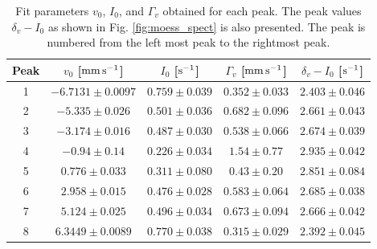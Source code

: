 \documentclass[a4paper]{report}
\numberwithin{equation}{section}
\begin{document}
\begin{table}[!ht]
    \centering
    \begin{tabular}{|c|c|c|c|c|}
    \hline
    Peak & $v_0$ [$\si[]{\milli\meter\per\second}$] & $I_0$ [$\si[]{\per\second}$] & $\Gamma_v$ [$\si[]{\milli\meter\per\second}$] & $\delta_v - I_0$ [$\si[]{\per\second}$]\\ \hline
        1 &$-6.7131 \pm 0.0097 $& $0.759 \pm 0.039$ & $0.352 \pm 0.033$ & $2.403 \pm 0.046$ \\ \hline
        2 &$-5.335 \pm 0.026 $& $0.501 \pm 0.036$ & $0.682 \pm 0.096$ & $2.661 \pm 0.043$ \\ \hline
        3 &$-3.174 \pm 0.016 $& $0.487 \pm 0.030$ & $0.538 \pm 0.066$ & $2.674 \pm 0.039$ \\ \hline
        4 &$-0.94 \pm 0.14 $& $0.226 \pm 0.034$ & $1.54 \pm 0.77$ & $2.935 \pm 0.042$ \\ \hline
        5 &$ 0.776 \pm 0.033 $& $0.311 \pm 0.080$ & $0.43 \pm 0.20$ & $2.851 \pm 0.084$ \\ \hline
        6 &$ 2.958 \pm 0.015 $& $0.476 \pm 0.028$ & $0.583 \pm 0.064$ & $2.685 \pm 0.038$ \\ \hline
        7 &$ 5.124 \pm 0.025 $& $0.496 \pm 0.034$ & $0.673 \pm 0.094$ & $2.666 \pm 0.042$ \\ \hline
        8 &$ 6.3449 \pm 0.0089 $& $0.770 \pm 0.038$ & $0.315 \pm 0.029$ & $2.392 \pm 0.045$ \\ \hline
    \end{tabular}
    \caption{Fit parameters $v_0$, $I_0$, and $\Gamma_v$ obtained for each peak. The peak values $\delta_v - I_0$ 
			as shown in Fig. \ref{fig:moess_spect} is also presented.
			 The peak is numbered from the left most peak to the rightmost peak.}
	\label{tab:fit_params}
\end{table}

\end{document}
